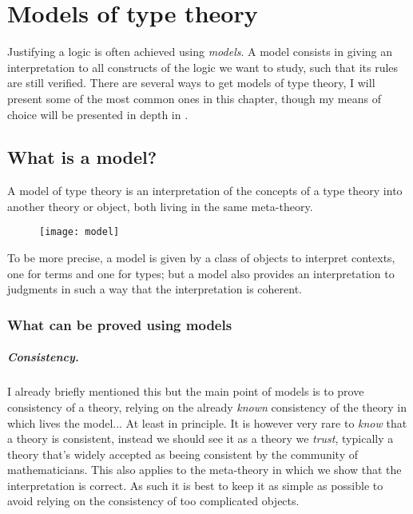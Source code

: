 \chapter{Models of type theory}

Justifying a logic is often achieved using \emph{models}. A model consists
in giving an interpretation to all constructs of the logic we want to study,
such that its rules are still verified.
There are several ways to get models of type theory, I will present some of the
most common ones in this chapter, though my means of choice will be presented in
depth in .

\section{What is a model?}

A model of type theory is an interpretation of the concepts of a type theory
into another theory or object, both living in the same meta-theory.
\begin{figure}[hb]
  \texttt{[image: model]}
\end{figure}
To be more precise, a model is given by a class of objects to interpret
contexts, one for terms and one for types; but a model also provides an
interpretation to judgments in such a way that the interpretation is coherent.

\subsection{What can be proved using models}

\paragraph{Consistency.}

I already briefly mentioned this but the main point of models is to prove
consistency of a theory, relying on the already \emph{known} consistency of the
theory in which lives the model... At least in principle. It is however very
rare to \emph{know} that a theory is consistent, instead
we should see it as a theory we \emph{trust}, typically a theory that's widely
accepted as beeing consistent by the community of mathematicians.
This also applies to the meta-theory in which we show that the interpretation is
correct. As such it is best to keep it as simple as possible to avoid relying on
the consistency of too complicated objects.

